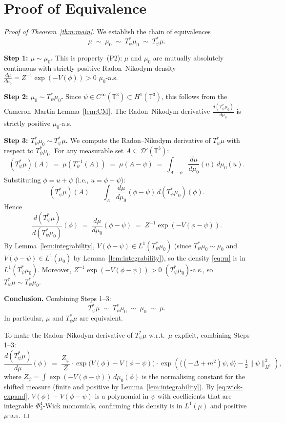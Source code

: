 \documentclass[12pt]{article}
\theoremstyle{definition}
\theoremstyle{remark}
\begin{document}
\section{Proof of Equivalence}

\begin{proof}[Proof of Theorem~\ref{thm:main}]
We establish the chain of equivalences
\[
  \mu \;\sim\; \mu_0 \;\sim\; T_\psi^*\mu_0 \;\sim\; T_\psi^*\mu.
\]

\textbf{Step 1: $\mu\sim\mu_0$.}
This is property~(P2): $\mu$ and $\mu_0$ are mutually absolutely continuous
with strictly positive Radon--Nikodym density $\frac{d\mu}{d\mu_0}
= Z^{-1}\exp(-V(\phi)) > 0$ $\mu_0$-a.s.

\textbf{Step 2: $\mu_0\sim T_\psi^*\mu_0$.}
Since $\psi\in C^\infty(\mathbb{T}^3)\subset H^1(\mathbb{T}^3)$, this follows
from the Cameron--Martin Lemma~\ref{lem:CM}.  The Radon--Nikodym derivative
$\frac{d(T_\psi^*\mu_0)}{d\mu_0}$ is strictly positive $\mu_0$-a.s.

\textbf{Step 3: $T_\psi^*\mu_0\sim T_\psi^*\mu$.}
We compute the Radon--Nikodym derivative of $T_\psi^*\mu$ with respect to
$T_\psi^*\mu_0$.  For any measurable set $A\subseteq\mathcal{D}'(\mathbb{T}^3)$:
\[
  (T_\psi^*\mu)(A)
  \;=\; \mu\!\left(T_\psi^{-1}(A)\right)
  \;=\; \mu(A - \psi)
  \;=\; \int_{A-\psi}\frac{d\mu}{d\mu_0}(u)\,d\mu_0(u).
\]
Substituting $\phi = u + \psi$ (i.e., $u = \phi - \psi$):
\[
  (T_\psi^*\mu)(A)
  \;=\; \int_A \frac{d\mu}{d\mu_0}(\phi-\psi)\,d(T_\psi^*\mu_0)(\phi).
\]
Hence
\begin{equation}\label{eq:rn}
  \frac{d(T_\psi^*\mu)}{d(T_\psi^*\mu_0)}(\phi)
  \;=\; \frac{d\mu}{d\mu_0}(\phi-\psi)
  \;=\; Z^{-1}\exp(-V(\phi-\psi)).
\end{equation}
By Lemma~\ref{lem:integrability}, $V(\phi-\psi)\in L^1(T_\psi^*\mu_0)$
(since $T_\psi^*\mu_0\sim\mu_0$ and $V(\phi-\psi)\in L^1(\mu_0)$ by
Lemma~\ref{lem:integrability}), so the density \eqref{eq:rn} is in
$L^1(T_\psi^*\mu_0)$.  Moreover, $Z^{-1}\exp(-V(\phi-\psi)) > 0$
$(T_\psi^*\mu_0)$-a.s., so $T_\psi^*\mu\sim T_\psi^*\mu_0$.

\textbf{Conclusion.}
Combining Steps 1--3:
\[
  T_\psi^*\mu \;\sim\; T_\psi^*\mu_0 \;\sim\; \mu_0 \;\sim\; \mu.
\]
In particular, $\mu$ and $T_\psi^*\mu$ are equivalent.

\medskip
\noindent To make the Radon--Nikodym derivative of $T_\psi^*\mu$ w.r.t.\ $\mu$
explicit, combining Steps 1--3:
\begin{equation}
  \frac{d(T_\psi^*\mu)}{d\mu}(\phi)
  \;=\;
  \frac{Z_\psi}{Z}
  \cdot
  \exp\!\bigl(V(\phi) - V(\phi-\psi)\bigr)
  \cdot
  \exp\!\left(\langle(-\Delta+m^2)\psi,\phi\rangle
    - \tfrac{1}{2}\|\psi\|_{H^1}^2\right),
\end{equation}
where $Z_\psi = \int \exp(-V(\phi-\psi))\,d\mu_0(\phi)$ is the normalising
constant for the shifted measure (finite and positive by
Lemma~\ref{lem:integrability}).  By \eqref{eq:wick-expand},
$V(\phi) - V(\phi-\psi)$ is a polynomial in $\psi$ with coefficients that
are integrable $\Phi^4_3$-Wick monomials, confirming this density is in
$L^1(\mu)$ and positive $\mu$-a.s.
\end{proof}
\end{document}
